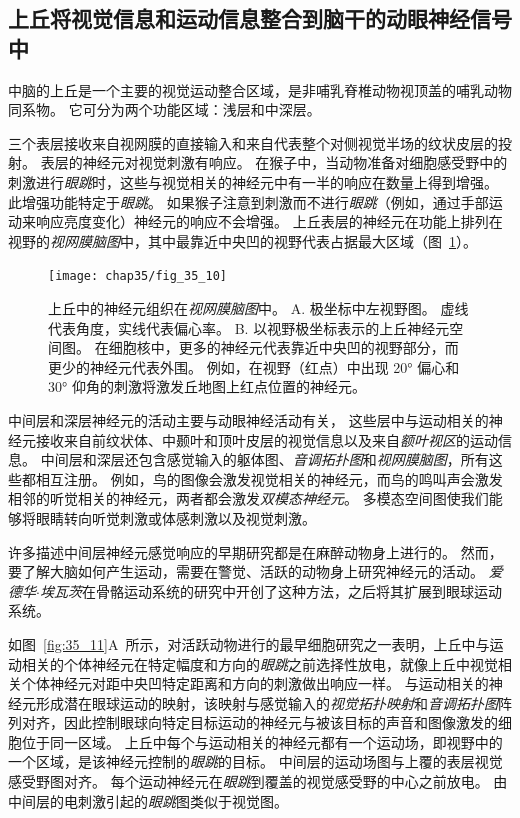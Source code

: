 \subsection{上丘将视觉信息和运动信息整合到脑干的动眼神经信号中}

中脑的上丘是一个主要的视觉运动整合区域，是非哺乳脊椎动物视顶盖的哺乳动物同系物。
它可分为两个功能区域：浅层和中深层。


三个表层接收来自视网膜的直接输入和来自代表整个对侧视觉半场的纹状皮层的投射。
表层的神经元对视觉刺激有响应。
在猴子中，当动物准备对细胞感受野中的刺激进行\textit{眼跳}时，这些与视觉相关的神经元中有一半的响应在数量上得到增强。
此增强功能特定于\textit{眼跳}。
如果猴子注意到刺激而不进行\textit{眼跳}（例如，通过手部运动来响应亮度变化）神经元的响应不会增强。
上丘表层的神经元在功能上排列在视野的\textit{视网膜脑图}中，其中最靠近中央凹的视野代表占据最大区域（图~\ref{fig:35_10}）。


\begin{figure}[htbp]
	\centering
	\texttt{[image: chap35/fig\_35\_10]}
	\caption{上丘中的神经元组织在\textit{视网膜脑图}中。
		A. 极坐标中左视野图。
		虚线代表角度，实线代表偏心率。
		B. 以视野极坐标表示的上丘神经元空间图。
		在细胞核中，更多的神经元代表靠近中央凹的视野部分，而更少的神经元代表外围。
		例如，在视野（红点）中出现 20° 偏心和 30° 仰角的刺激将激发丘地图上红点位置的神经元\cite{aizawa1998reversible}。}
	\label{fig:35_10}
\end{figure}


中间层和深层神经元的活动主要与动眼神经活动有关，
这些层中与运动相关的神经元接收来自前纹状体、中颞叶和顶叶皮层的视觉信息以及来自\textit{额叶视区}的运动信息。
中间层和深层还包含感觉输入的躯体图、\textit{音调拓扑图}和\textit{视网膜脑图}，所有这些都相互注册。
例如，鸟的图像会激发视觉相关的神经元，而鸟的鸣叫声会激发相邻的听觉相关的神经元，两者都会激发\textit{双模态神经元}。
多模态空间图使我们能够将眼睛转向听觉刺激或体感刺激以及视觉刺激。


许多描述中间层神经元感觉响应的早期研究都是在麻醉动物身上进行的。
然而，要了解大脑如何产生运动，需要在警觉、活跃的动物身上研究神经元的活动。
\textit{爱德华$\cdot$埃瓦茨}在骨骼运动系统的研究中开创了这种方法，之后将其扩展到眼球运动系统。


如图~\ref{fig:35_11}A~所示，对活跃动物进行的最早细胞研究之一表明，上丘中与运动相关的个体神经元在特定幅度和方向的\textit{眼跳}之前选择性放电，就像上丘中视觉相关个体神经元对距中央凹特定距离和方向的刺激做出响应一样。
与运动相关的神经元形成潜在眼球运动的映射，该映射与感觉输入的\textit{视觉拓扑映射}和\textit{音调拓扑图}阵列对齐，因此控制眼球向特定目标运动的神经元与被该目标的声音和图像激发的细胞位于同一区域。
上丘中每个与运动相关的神经元都有一个运动场，即视野中的一个区域，是该神经元控制的\textit{眼跳}的目标。
中间层的运动场图与上覆的表层视觉感受野图对齐。
每个运动神经元在\textit{眼跳}到覆盖的视觉感受野的中心之前放电。
由中间层的电刺激引起的\textit{眼跳}图类似于视觉图。


